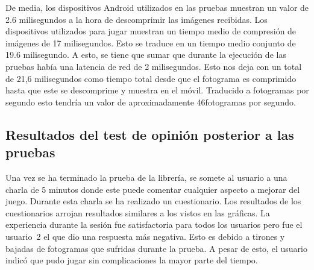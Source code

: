 De media, los dispositivos Android utilizados en las pruebas muestran un valor de 2.6 milisegundos a la hora de descomprimir las im\'agenes recibidas. Los dispositivos utilizados para jugar muestran un tiempo medio de compresi\'on de im\'agenes de 17 milisegundos. Esto se traduce en un tiempo medio conjunto de 19.6 milisegundo. A esto, se tiene que sumar que durante la ejecuci\'on de las pruebas hab\'ia una latencia de red de 2 milisegundos. Esto nos deja con un total de 21,6 milisegundos como tiempo total desde que el fotograma es comprimido hasta que este se descomprime y muestra en el m\'ovil. Traducido a fotogramas por segundo esto tendr\'ia un valor de aproximadamente 46fotogramas por segundo.

\subsection{Resultados del test de opini\'on posterior a las pruebas}

Una vez se ha terminado la prueba de la librer\'ia, se somete al usuario a una charla de 5 minutos donde este puede comentar cualquier aspecto a mejorar del juego. Durante esta charla se ha realizado un cuestionario. Los resultados de los cuestionarios arrojan resultados similares a los vistos en las gr\'aficas. La experiencia durante la sesi\'on fue satisfactoria para todos los usuarios pero fue el usuario~2 el que dio una respuesta m\'as negativa. Esto es debido a tirones y bajadas de fotogramas que sufridas durante la prueba. A pesar de esto, el usuario indic\'o que pudo jugar sin complicaciones la mayor parte del tiempo.

\begin{table}[h]
\caption{Resultados del test realizado a los usuarios posterior a la prueba}
\label{opinionesusuarios}
\end{table}



